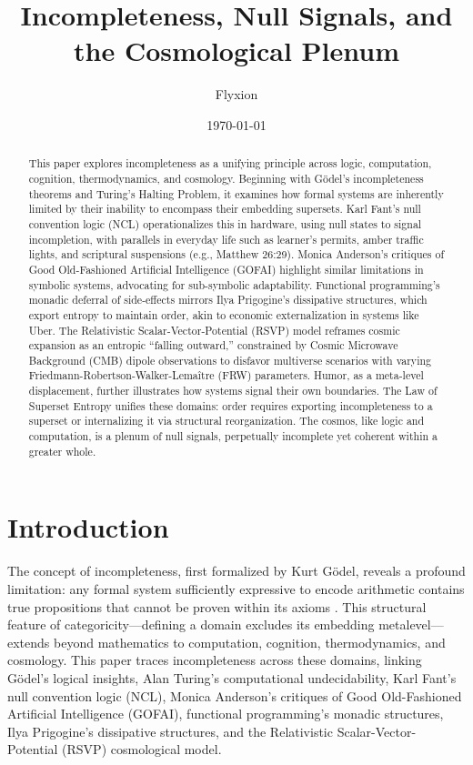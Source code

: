 \documentclass{article}
\begin{document}
\title{Incompleteness, Null Signals, and the Cosmological Plenum}
\author{Flyxion}
\date{\today}
\maketitle

\begin{abstract}
This paper explores incompleteness as a unifying principle across logic, computation, cognition, thermodynamics, and cosmology. Beginning with G\"{o}del's incompleteness theorems and Turing's Halting Problem, it examines how formal systems are inherently limited by their inability to encompass their embedding supersets. Karl Fant's null convention logic (NCL) operationalizes this in hardware, using null states to signal incompletion, with parallels in everyday life such as learner's permits, amber traffic lights, and scriptural suspensions (e.g., Matthew 26:29). Monica Anderson's critiques of Good Old-Fashioned Artificial Intelligence (GOFAI) highlight similar limitations in symbolic systems, advocating for sub-symbolic adaptability. Functional programming's monadic deferral of side-effects mirrors Ilya Prigogine's dissipative structures, which export entropy to maintain order, akin to economic externalization in systems like Uber. The Relativistic Scalar-Vector-Potential (RSVP) model reframes cosmic expansion as an entropic ``falling outward,'' constrained by Cosmic Microwave Background (CMB) dipole observations to disfavor multiverse scenarios with varying Friedmann-Robertson-Walker-Lema\^{i}tre (FRW) parameters. Humor, as a meta-level displacement, further illustrates how systems signal their own boundaries. The Law of Superset Entropy unifies these domains: order requires exporting incompleteness to a superset or internalizing it via structural reorganization. The cosmos, like logic and computation, is a plenum of null signals, perpetually incomplete yet coherent within a greater whole.
\end{abstract}

\section{Introduction}
\label{sec:intro}
The concept of incompleteness, first formalized by Kurt G\"{o}del, reveals a profound limitation: any formal system sufficiently expressive to encode arithmetic contains true propositions that cannot be proven within its axioms \citep{godel1931}. This structural feature of categoricity---defining a domain excludes its embedding metalevel---extends beyond mathematics to computation, cognition, thermodynamics, and cosmology. This paper traces incompleteness across these domains, linking G\"{o}del's logical insights, Alan Turing's computational undecidability, Karl Fant's null convention logic (NCL), Monica Anderson's critiques of Good Old-Fashioned Artificial Intelligence (GOFAI), functional programming's monadic structures, Ilya Prigogine's dissipative structures, and the Relativistic Scalar-Vector-Potential (RSVP) cosmological model.
\end{document}
